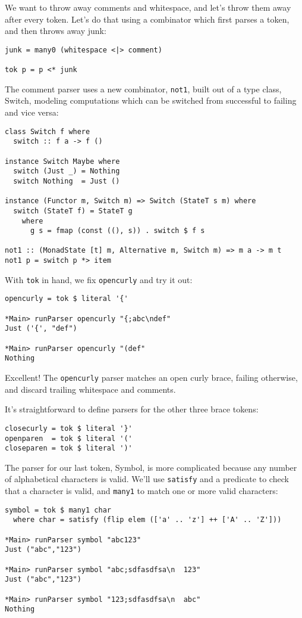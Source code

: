 \documentclass{tmr}
\begin{document}
We want to throw away comments and whitespace, and let's throw them away after 
every token.  Let's do that using a combinator which first parses a token, and 
then throws away junk:
\begin{verbatim}
junk = many0 (whitespace <|> comment) 

tok p = p <* junk
\end{verbatim}

The comment parser uses a new combinator, \verb+not1+, built out of a 
type class, Switch, modeling computations which can be switched from
successful to failing and vice versa:
\begin{verbatim}
class Switch f where
  switch :: f a -> f ()

instance Switch Maybe where
  switch (Just _) = Nothing
  switch Nothing  = Just ()

instance (Functor m, Switch m) => Switch (StateT s m) where
  switch (StateT f) = StateT g
    where 
      g s = fmap (const ((), s)) . switch $ f s

not1 :: (MonadState [t] m, Alternative m, Switch m) => m a -> m t
not1 p = switch p *> item
\end{verbatim}

With \verb+tok+ in hand, we fix \verb+opencurly+ and try it out:
\begin{verbatim}
opencurly = tok $ literal '{'

*Main> runParser opencurly "{;abc\ndef"
Just ('{', "def")

*Main> runParser opencurly "(def"
Nothing
\end{verbatim}

Excellent!  The \verb+opencurly+ parser matches an open curly brace, failing
otherwise, and discard trailing whitespace and comments.

It's straightforward to define parsers for the other three brace tokens:
\begin{verbatim}
closecurly = tok $ literal '}'
openparen  = tok $ literal '('
closeparen = tok $ literal ')'
\end{verbatim}

The parser for our last token, Symbol, is more complicated because any number of
alphabetical characters is valid.  We'll use \verb+satisfy+ and a
predicate to check that a character is valid, and \verb+many1+ to 
match one or more valid characters:
\begin{verbatim}
symbol = tok $ many1 char
  where char = satisfy (flip elem (['a' .. 'z'] ++ ['A' .. 'Z']))

*Main> runParser symbol "abc123"
Just ("abc","123")

*Main> runParser symbol "abc;sdfasdfsa\n  123"
Just ("abc","123")

*Main> runParser symbol "123;sdfasdfsa\n  abc"
Nothing
\end{verbatim}
\end{document}
